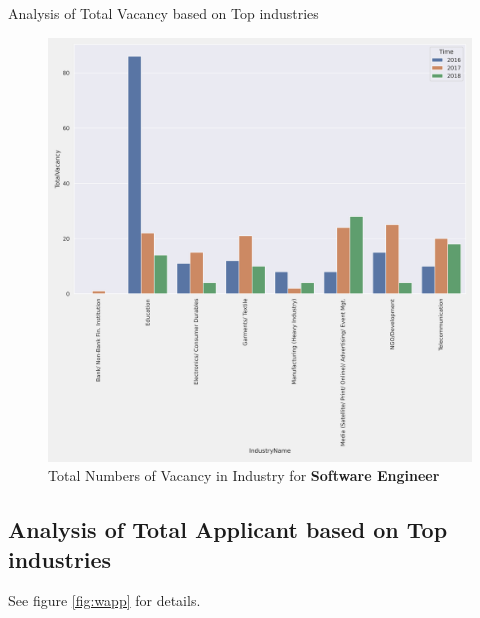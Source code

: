\documentclass{article}
\begin{document}
\begin{table}[!htb]
	\centering
	\caption{Analysis of Total Vacancy based on Top industries}
	\label{tab:wvac}
\end{table}


\begin{figure}[!h]
	\centering
	\label{fig:wvac}
	\caption{Total Numbers of Vacancy in Industry for \textbf{Software Engineer}}
	\includegraphics[scale=0.5]{Graphs/Web Developer_TotalVacancy_ttest.png}
\end{figure}

\pagebreak
\subsection{Analysis of Total Applicant based on Top industries}
See figure \ref{fig:wapp} for details.
\end{document}

